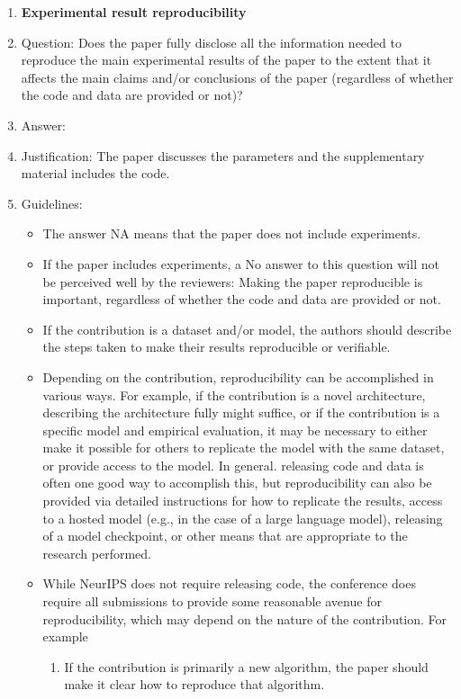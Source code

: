 \documentclass{article}
\theoremstyle{plain}
\theoremstyle{definition}
\begin{document}
\begin{enumerate}
    \item {\bf Experimental result reproducibility}
    \item[] Question: Does the paper fully disclose all the information needed to reproduce the main experimental results of the paper to the extent that it affects the main claims and/or conclusions of the paper (regardless of whether the code and data are provided or not)?
    \item[] Answer: \answerYes{}
    \item[] Justification: The paper discusses the parameters and the supplementary material includes the code.
    \item[] Guidelines:
    \begin{itemize}
        \item The answer NA means that the paper does not include experiments.
        \item If the paper includes experiments, a No answer to this question will not be perceived well by the reviewers: Making the paper reproducible is important, regardless of whether the code and data are provided or not.
        \item If the contribution is a dataset and/or model, the authors should describe the steps taken to make their results reproducible or verifiable. 
        \item Depending on the contribution, reproducibility can be accomplished in various ways. For example, if the contribution is a novel architecture, describing the architecture fully might suffice, or if the contribution is a specific model and empirical evaluation, it may be necessary to either make it possible for others to replicate the model with the same dataset, or provide access to the model. In general. releasing code and data is often one good way to accomplish this, but reproducibility can also be provided via detailed instructions for how to replicate the results, access to a hosted model (e.g., in the case of a large language model), releasing of a model checkpoint, or other means that are appropriate to the research performed.
        \item While NeurIPS does not require releasing code, the conference does require all submissions to provide some reasonable avenue for reproducibility, which may depend on the nature of the contribution. For example
        \begin{enumerate}
            \item If the contribution is primarily a new algorithm, the paper should make it clear how to reproduce that algorithm.

\end{enumerate}
\end{itemize}
\end{enumerate}
\end{document}

